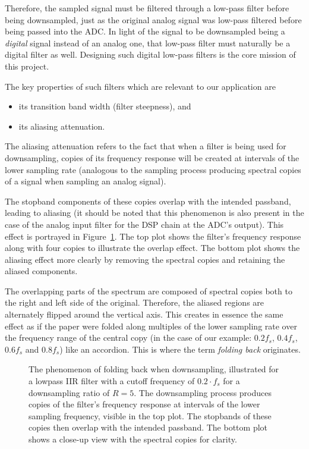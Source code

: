 Therefore,  the sampled  signal must  be  filtered through  a low-pass  filter
before  being downsampled,  just as  the original  analog signal  was low-pass
filtered  before being  passed into  the  ADC. In light  of the  signal to  be
downsampled  being a  \emph{digital} signal  instead  of an  analog one,  that
low-pass filter  must naturally  be a digital  filter as  well. Designing such
digital low-pass filters is the core mission of this project.

The key properties of such filters which are relevant to our application are
\begin{itemize}\tightlist
    \item
        its transition band width (filter steepness), and
    \item
        its aliasing attenuation.
\end{itemize}
The aliasing attenuation refers  to the fact that when a  filter is being used
for  downsampling,  copies  of  its  frequency response  will  be  created  at
intervals  of the  lower  sampling  rate (analogous  to  the sampling  process
producing spectral copies of a signal when sampling an analog signal).

The stopband  components of these  copies overlap with the  intended passband,
leading to aliasing  (it should be noted that this  phenomenon is also present
in  the case  of  the analog  input  filter for  the DSP  chain  at the  ADC's
output). This effect is  portrayed in Figure~\ref{fig:aliasing:iirCopies}. The
top  plot shows  the filter's  frequency response  along with  four copies  to
illustrate the overlap effect. The bottom  plot shows the aliasing effect more
clearly by removing the spectral copies and retaining the aliased components.

The overlapping parts of the spectrum  are composed of spectral copies both to
the right  and left side of  the original. Therefore, the aliased  regions are
alternately flipped around the vertical axis. This creates in essence the same
effect  as if  the paper  were folded  along multiples  of the  lower sampling
rate  over the  frequency  range of  the  central  copy (in  the  case of  our
example: $0.2f_s$, $0.4f_s$, $0.6f_s$ and $0.8f_s$) like an accordion. This is
where the term \emph{folding back} originates.

\begin{figure}
    \centering
    
    \caption[Folding Back of Stopband Components Into Passband]{%
        The phenomenon  of folding back  when downsampling, illustrated  for a
        lowpass IIR  filter with a  cutoff frequency  of $0.2\cdot f_s$  for a
        downsampling ratio of $R=5$.  The downsampling process produces copies
        of the filter's frequency response  at intervals of the lower sampling
        frequency, visible  in the  top plot.  The  stopbands of  these copies
        then  overlap with  the intended  passband.  The  bottom plot  shows a
        close-up view with the spectral copies for clarity.%
    }
    \label{fig:aliasing:iirCopies}
\end{figure}

